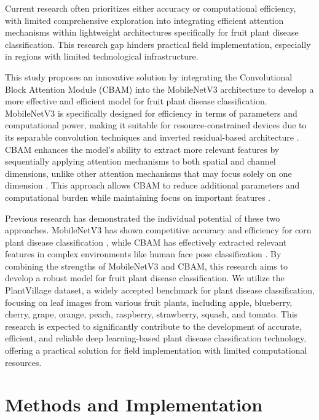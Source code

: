 \documentclass[preprint,12pt]{elsarticle}
\begin{document}
Current research often prioritizes either accuracy or computational efficiency, with limited comprehensive exploration into integrating efficient attention mechanisms within lightweight architectures specifically for fruit plant disease classification. This research gap hinders practical field implementation, especially in regions with limited technological infrastructure.

This study proposes an innovative solution by integrating the Convolutional Block Attention Module (CBAM) into the MobileNetV3 architecture to develop a more effective and efficient model for fruit plant disease classification. MobileNetV3 is specifically designed for efficiency in terms of parameters and computational power, making it suitable for resource-constrained devices due to its separable convolution techniques and inverted residual-based architecture \cite{Howard2019, Maharani2025}. CBAM enhances the model's ability to extract more relevant features by sequentially applying attention mechanisms to both spatial and channel dimensions, unlike other attention mechanisms that may focus solely on one dimension \cite{MuhammadAlqadri2024, Woo2018, Zhang2022}. This approach allows CBAM to reduce additional parameters and computational burden while maintaining focus on important features \cite{Zhang2021, Zhang2022}.

Previous research has demonstrated the individual potential of these two approaches. MobileNetV3 has shown competitive accuracy and efficiency for corn plant disease classification \cite{Syaharani2023}, while CBAM has effectively extracted relevant features in complex environments like human face pose classification \cite{Chen2022}. By combining the strengths of MobileNetV3 and CBAM, this research aims to develop a robust model for fruit plant disease classification. We utilize the PlantVillage dataset, a widely accepted benchmark for plant disease classification, focusing on leaf images from various fruit plants, including apple, blueberry, cherry, grape, orange, peach, raspberry, strawberry, squash, and tomato. This research is expected to significantly contribute to the development of accurate, efficient, and reliable deep learning-based plant disease classification technology, offering a practical solution for field implementation with limited computational resources.

\section{Methods and Implementation}
\end{document}
